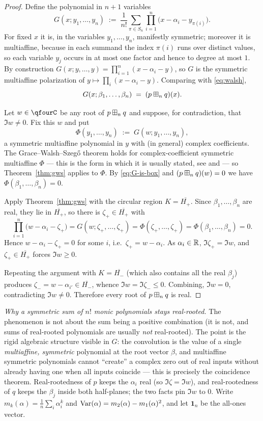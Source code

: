 \begin{proof}
Define the polynomial in $n+1$ variables
\[
G(x;y_1,\dots,y_n)\;:=\;\frac{1}{n!}\sum_{\pi\in S_n}\prod_{i=1}^n\bigl(x-\alpha_i-y_{\pi(i)}\bigr).
\]
For fixed $x$ it is, in the variables $y_1,\dots,y_n$, manifestly symmetric;
moreover it is multiaffine, because in each summand the index $\pi(i)$ runs over
distinct values, so each variable $y_j$ occurs in at most one factor and hence to
degree at most $1$. By construction $G(x;y,\dots,y)=\prod_{i=1}^n(x-\alpha_i-y)$,
so $G$ is the symmetric multiaffine polarization of
$y\mapsto\prod_i(x-\alpha_i-y)$. Comparing with \eqref{eq:walsh},
\begin{equation}\label{eq:G-is-box}
G(x;\beta_1,\dots,\beta_n)\;=\;(p\boxplus_n q)(x).
\end{equation}

Let $w\in\qfourC$ be any root of $p\boxplus_n q$ and suppose, for contradiction,
that $\Im w\ne0$. Fix this $w$ and put
\[
\Phi(y_1,\dots,y_n)\;:=\;G(w;y_1,\dots,y_n),
\]
a symmetric multiaffine polynomial in $y$ with (in general) complex
coefficients. The Grace--Walsh--Szeg\H{o} theorem holds for complex-coefficient
symmetric multiaffine $\Phi$ --- this is the form in which it is usually stated,
see \cite[Thm.~3.4.1b]{RS} and \cite{MSS22} --- so Theorem~\ref{thm:gws}
applies to $\Phi$. By \eqref{eq:G-is-box} and
$(p\boxplus_n q)(w)=0$ we have $\Phi(\beta_1,\dots,\beta_n)=0$.

Apply Theorem~\ref{thm:gws} with the circular region $K=\overline{H_+}$. Since
$\beta_1,\dots,\beta_n$ are real, they lie in $\overline{H_+}$, so there is
$\zeta_+\in\overline{H_+}$ with
\[
\prod_{i=1}^n\bigl(w-\alpha_i-\zeta_+\bigr)=G(w;\zeta_+,\dots,\zeta_+)
=\Phi(\zeta_+,\dots,\zeta_+)=\Phi(\beta_1,\dots,\beta_n)=0 .
\]
Hence $w-\alpha_i-\zeta_+=0$ for some $i$, i.e.\ $\zeta_+=w-\alpha_i$. As
$\alpha_i\in\mathbb{R}$, $\Im\zeta_+=\Im w$, and $\zeta_+\in\overline{H_+}$ forces
$\Im w\ge0$.

Repeating the argument with $K=\overline{H_-}$ (which also contains all the real
$\beta_j$) produces $\zeta_-=w-\alpha_{i'}\in\overline{H_-}$, whence
$\Im w=\Im\zeta_-\le0$. Combining, $\Im w=0$, contradicting $\Im w\ne0$.
Therefore every root of $p\boxplus_n q$ is real.
\end{proof}

\noindent\emph{Why a symmetric sum of $n!$ monic polynomials stays real-rooted.}
The phenomenon is not about the sum being a positive combination (it is not, and
sums of real-rooted polynomials are usually \emph{not} real-rooted). The point
is the rigid algebraic structure visible in $G$: the convolution is the value of
a single \emph{multiaffine, symmetric} polynomial at the root vector $\beta$, and
multiaffine symmetric polynomials cannot ``create'' a complex zero out of real
inputs without already having one when all inputs coincide --- this is precisely
the coincidence theorem. Real-rootedness of $p$ keeps the $\alpha_i$ real (so
$\Im\zeta=\Im w$), and real-rootedness of $q$ keeps the $\beta_j$ inside both
half-planes; the two facts pin $\Im w$ to $0$. Write
$m_k(\alpha)=\frac1n\sum_i\alpha_i^k$ and
$\operatorname{Var}(\alpha)=m_2(\alpha)-m_1(\alpha)^2$, and let $\mathbf 1_n$ be the all-ones
vector.

